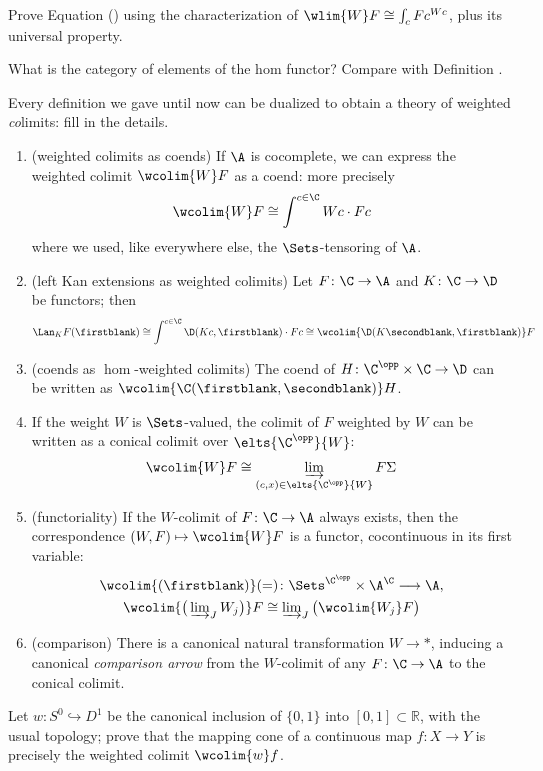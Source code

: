\begin{exerciseset}
\begin{exercisepoints}
\item Prove Equation () using the characterization of $\wlim{W}F\cong \int_c Fc^{Wc}$, plus its universal property.
\item What is the category of elements of the hom functor? Compare with Definition .
\item \label{ex4:wcolims} Every definition we gave until now can be dualized to obtain a theory of weighted \emph{co}limits: fill in the details.
\begin{enumerate}[label=$\roman*$)]
	\item (weighted colimits as coends) If $\A$ is cocomplete, we can express the weighted colimit $\wcolim{W}F$ as a coend: more precisely
	\[
	\wcolim{W}F\cong \int^{c\in\C} Wc\cdot Fc
	\] 
	where we used, like everywhere else, the $\Sets$-tensoring of $\A$.
	\item (left Kan extensions as weighted colimits) Let $F\colon \C\to \A$ and $K\colon \C\to \D$ be functors; then 
	\[
	\Lan_KF(\firstblank)\cong \int^{c\in\C} \D(Kc,\firstblank)\cdot Fc\cong \wcolim{\D(K\secondblank,\firstblank)}F
	\]
	\item (coends as $\hom$-weighted colimits) The coend of $H\colon \C^\opp\times\C\to \D$ can be written as  $\wcolim{\C(\firstblank,\secondblank)}H$.
	\item If the weight $W$ is $\Sets$-valued, the colimit of $F$ weighted by $W$ can be written as a conical colimit over $\elts{\C^\opp}{W}$: 
	\[
	 \wcolim{W}F\cong \varinjlim_{(c,x)\in \elts{\C^\opp}{W}}F\Sigma
	\]
	\item (functoriality) If the $W$-colimit of $F\colon\C\to\A$ always exists, then the correspondence $(W,F)\mapsto \wcolim{W}F$ is a functor, cocontinuous in its first variable:
	\begin{gather}
	\wcolim{(\firstblank)}(=)\colon \Sets^{\C^\opp} \times \A^\C\longrightarrow \A, \notag \\
	\textstyle 
	\wcolim{\big(\varinjlim_J W_j\big)}F\cong \varinjlim_J \big(\wcolim{W_j}F\big)
	\end{gather}
	\item (comparison) There is a canonical natural transformation $W\to *$, inducing a canonical \emph{comparison arrow} from the $W$-colimit of any $F\colon \C\to \A$ to the conical colimit.
\end{enumerate}
\item \label{ex:cone-again} Let $w\colon S^0 \hookrightarrow D^1$ be the canonical inclusion of $\{0,1\}$ into $[0,1]\subset \mathbb{R}$, with the usual topology; prove that the mapping cone of a continuous map $f\colon X\to Y$ is precisely the weighted colimit $\wcolim{w}f$.

\end{exercisepoints}
\end{exerciseset}
